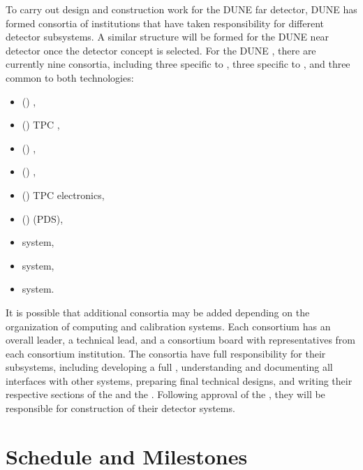 To carry out design and construction work for the DUNE far detector, DUNE has  formed consortia of institutions that have taken responsibility for different detector subsystems. A similar structure will be formed for the DUNE near detector once the detector concept is selected. For the DUNE , there are currently nine consortia, including three specific to \single, three specific to \dual, and three common to both technologies:
\begin{itemize}
\item (\single) , %
\item (\single) TPC , %
\item (\single) , %
\item (\dual) , %
\item (\dual) TPC electronics, %
\item (\dual)  (PDS), %
\item {} system, %
\item {} system, %
\item {} system. %
\end{itemize}
It is possible that additional consortia may be added depending on the organization of computing and calibration systems. Each consortium has an overall leader, a technical lead, and a consortium board with representatives from each consortium institution. The consortia have full responsibility for their subsystems, including developing a full , understanding and documenting all interfaces with other systems, preparing final technical designs, and writing their respective sections of the  and the . Following approval of the  , they will be responsible for construction of their detector systems. %


\section{Schedule and Milestones} 

